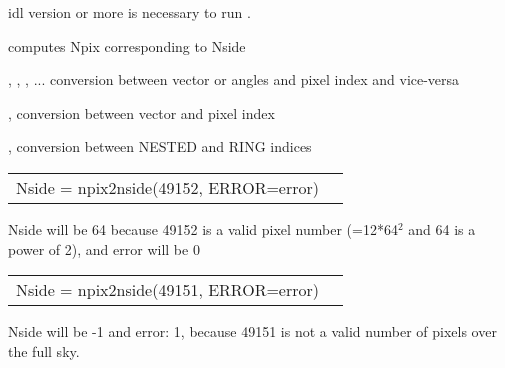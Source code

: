 \begin{related}
  \begin{sulist}{} %
    \item[idl] version \idlversion or more is necessary to run \facname.	
    \item[\htmlref{nside2npix}{idl:nside2npix}] computes Npix corresponding to Nside 
    \item[\htmlref{pix2xxx}{idl:pix_tools}, \htmlref{ang2xxx}{idl:pix_tools}, \htmlref{vec2xxx}{idl:pix_tools}, ... ] conversion between vector or angles and pixel index and vice-versa
    \item[\htmlref{vec2pix}{idl:pix_tools}, \htmlref{pix2vec}{idl:pix_tools}] conversion between vector and pixel index
    \item[\htmlref{nest2ring}{idl:pix_tools}, \htmlref{ring2nest}{idl:pix_tools}] conversion between NESTED and RING indices
  \end{sulist}
\end{related}

\begin{example}
{
\begin{tabular}{ll} %
Nside = npix2nside(49152, ERROR=error)
\end{tabular}
}
{
Nside will be 64 because 49152 is a valid pixel number (=12*64$^2$ and 64 is a power of 2), and error will be 0}
\end{example}
\begin{example}
{
\begin{tabular}{ll} %
Nside = npix2nside(49151, ERROR=error)
\end{tabular}
}
{
Nside will be -1 and error: 1, because 49151 is not a valid number of \healpix
pixels over the full sky.}
\end{example}


